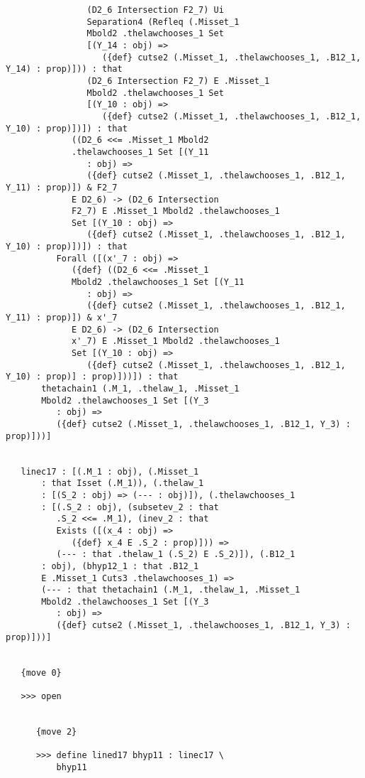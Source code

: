 \documentclass[12pt]{article}
\begin{document}
\begin{verbatim}
                (D2_6 Intersection F2_7) Ui 
                Separation4 (Refleq (.Misset_1 
                Mbold2 .thelawchooses_1 Set 
                [(Y_14 : obj) => 
                   ({def} cutse2 (.Misset_1, .thelawchooses_1, .B12_1, Y_14) : prop)])) : that 
                (D2_6 Intersection F2_7) E .Misset_1 
                Mbold2 .thelawchooses_1 Set 
                [(Y_10 : obj) => 
                   ({def} cutse2 (.Misset_1, .thelawchooses_1, .B12_1, Y_10) : prop)])]) : that 
             ((D2_6 <<= .Misset_1 Mbold2 
             .thelawchooses_1 Set [(Y_11 
                : obj) => 
                ({def} cutse2 (.Misset_1, .thelawchooses_1, .B12_1, Y_11) : prop)]) & F2_7 
             E D2_6) -> (D2_6 Intersection 
             F2_7) E .Misset_1 Mbold2 .thelawchooses_1 
             Set [(Y_10 : obj) => 
                ({def} cutse2 (.Misset_1, .thelawchooses_1, .B12_1, Y_10) : prop)])]) : that 
          Forall ([(x'_7 : obj) => 
             ({def} ((D2_6 <<= .Misset_1 
             Mbold2 .thelawchooses_1 Set [(Y_11 
                : obj) => 
                ({def} cutse2 (.Misset_1, .thelawchooses_1, .B12_1, Y_11) : prop)]) & x'_7 
             E D2_6) -> (D2_6 Intersection 
             x'_7) E .Misset_1 Mbold2 .thelawchooses_1 
             Set [(Y_10 : obj) => 
                ({def} cutse2 (.Misset_1, .thelawchooses_1, .B12_1, Y_10) : prop)] : prop)]))]) : that 
       thetachain1 (.M_1, .thelaw_1, .Misset_1 
       Mbold2 .thelawchooses_1 Set [(Y_3 
          : obj) => 
          ({def} cutse2 (.Misset_1, .thelawchooses_1, .B12_1, Y_3) : prop)]))]


   linec17 : [(.M_1 : obj), (.Misset_1 
       : that Isset (.M_1)), (.thelaw_1 
       : [(S_2 : obj) => (--- : obj)]), (.thelawchooses_1 
       : [(.S_2 : obj), (subsetev_2 : that 
          .S_2 <<= .M_1), (inev_2 : that 
          Exists ([(x_4 : obj) => 
             ({def} x_4 E .S_2 : prop)])) => 
          (--- : that .thelaw_1 (.S_2) E .S_2)]), (.B12_1 
       : obj), (bhyp12_1 : that .B12_1 
       E .Misset_1 Cuts3 .thelawchooses_1) => 
       (--- : that thetachain1 (.M_1, .thelaw_1, .Misset_1 
       Mbold2 .thelawchooses_1 Set [(Y_3 
          : obj) => 
          ({def} cutse2 (.Misset_1, .thelawchooses_1, .B12_1, Y_3) : prop)]))]


   {move 0}

   >>> open


      {move 2}

      >>> define lined17 bhyp11 : linec17 \
          bhyp11



\end{verbatim}
\end{document}
